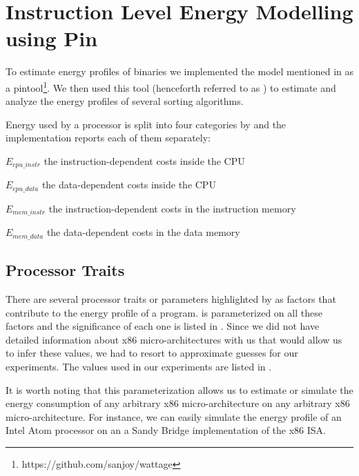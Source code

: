
\chapter{Instruction Level Energy Modelling using Pin}

\label{Chapter2}


To estimate energy profiles of binaries we implemented the model
mentioned in \cite[Steinke et. al.]{steinke} as a
pintool\footnote{https://github.com/sanjoy/wattage}.  We then used
this tool (henceforth referred to as \wattage) to estimate and
analyze the energy profiles of several sorting algorithms.

Energy used by a processor is split into four categories by
\cite{steinke} and the implementation reports each of them separately:

\begin{description*}
\label{lst:fields-desc}
\item[$E_{cpu\_instr}$] the instruction-dependent costs inside the CPU
\item[$E_{cpu\_data}$] the data-dependent costs inside the CPU
\item[$E_{mem\_instr}$] the instruction-dependent costs in the
  instruction memory
\item[$E_{mem\_data}$] the data-dependent costs in the data memory
\end{description*}

\section{Processor Traits}

There are several processor traits or parameters highlighted by
\cite{steinke} as factors that contribute to the energy profile of a
program. \wattage is parameterized on all these factors and the
significance of each one is listed in .
Since we did not have detailed information about x86
micro-architectures with us that would allow us to infer these values,
we had to resort to approximate guesses for our experiments.  The
values used in our experiments are listed in
.

It is worth noting that this parameterization allows us to estimate or
simulate the energy consumption of any arbitrary x86
micro-architecture on any arbitrary x86 micro-architecture.  For
instance, we can easily simulate the energy profile of an Intel Atom
processor on an a Sandy Bridge implementation of the x86 ISA.

